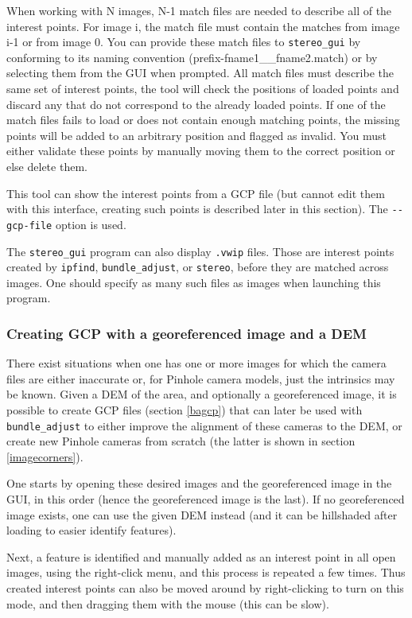 When working with N images, N-1 match files are needed to describe all of
the interest points.  For image i, the match file must contain the matches
from image i-1 or from image 0.  You can provide these match files to 
\texttt{stereo\_gui} by conforming to its naming convention
(prefix-fname1\_\_fname2.match) or by selecting them from the GUI when 
prompted.  All match files must describe the same set of interest points,
the tool will check the positions of loaded points and discard any that
do not correspond to the already loaded points.  If one of the match files 
fails to load or does not contain enough matching points, the missing points
will be added to an arbitrary position and flagged as invalid.  You must
either validate these points by manually moving them to the correct position
or else delete them.

This tool can show the interest points from a GCP file (but cannot edit them
with this interface, creating such points is described later in this section). 
The \texttt{-\/-gcp-file} option is used. 

The \texttt{stereo\_gui} program can also display \texttt{.vwip}
files. Those are interest points created by \texttt{ipfind},
\texttt{bundle\_adjust}, or \texttt{stereo}, before they are matched
across images. One should specify as many such files as images when
launching this program.

\subsubsection{Creating GCP with a georeferenced image and a DEM}
\label{creatinggcp}

There exist situations when one has one or more images for which the 
camera files are either inaccurate or, for Pinhole camera models, 
just the intrinsics may be known. Given a DEM of the area, and optionally
a georeferenced image, it is possible to create GCP files (section \ref{bagcp})
that can later be used with \texttt{bundle\_adjust} to either improve the alignment
of these cameras to the DEM, or create new Pinhole cameras from scratch
(the latter is shown in section \ref{imagecorners}).

One starts by opening these desired images and the georeferenced image in the GUI,
in this order (hence the georeferenced image is the last). 
If no georeferenced image exists, one can use the given DEM instead (and it can be 
hillshaded after loading to easier identify features). 

Next, a feature is identified and manually added as an interest point in all open images,
using the right-click menu, and this process is repeated a few times. 
Thus created interest points can also be moved around by right-clicking to turn on 
this mode, and then dragging them with the mouse (this can be slow). 

